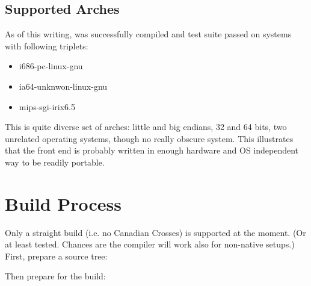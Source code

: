 \documentclass[a4paper,11pt]{article}
\begin{document}
\subsection{Supported Arches}

As of this writing,  was successfully compiled and
test suite passed on systems with following triplets:

\begin{itemize}
\item i686-pc-linux-gnu
\item ia64-unknwon-linux-gnu
\item mips-sgi-irix6.5
\end{itemize}

This is quite diverse set of arches: little and big endians, 32 and 64
bits, two unrelated operating systems, though no really obscure
system.  This illustrates that the front end is probably written in
enough hardware and OS independent way to be readily portable.

\section{Build Process}

Only a straight build (i.e. no Canadian Crosses) is supported at the
moment. (Or at least tested.  Chances are the compiler will work also
for non-native setups.)  First, prepare a source tree:


Then prepare for the build:

\end{document}
